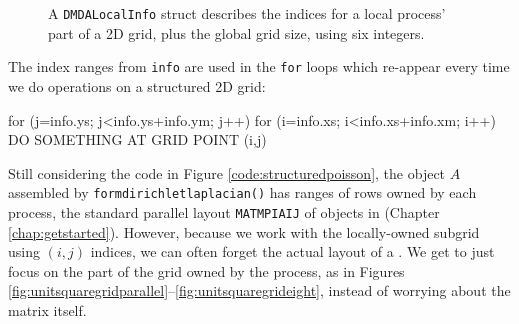 \begin{figure}
\caption{A \texttt{DMDALocalInfo} struct describes the indices for a local process' part of a 2D grid, plus the global grid size, using six integers.}
\label{fig:localpartofgrid}
\end{figure}

The index ranges from \texttt{info} are used in the \texttt{for} loops which re-appear every time we do operations on a structured 2D grid:
\begin{code}
for (j=info.ys; j<info.ys+info.ym; j++) {
  for (i=info.xs; i<info.xs+info.xm; i++) {
    DO SOMETHING AT GRID POINT (i,j)
  }
}
\end{code}

Still considering the code in Figure \ref{code:structuredpoisson}, the \pMat object $A$ assembled by \texttt{formdirichletlaplacian()}  has ranges of rows owned by each process, the standard parallel layout \texttt{MATMPIAIJ} of \pMat objects in \PETSc (Chapter \ref{chap:getstarted}).  However, because we work with the locally-owned subgrid using $(i,j)$ indices, we can often forget the actual layout of a \pMat.  We get to just focus on the part of the grid owned by the process, as in Figures \ref{fig:unitsquaregridparallel}--\ref{fig:unitsquaregrideight}, instead of worrying about the matrix itself.

